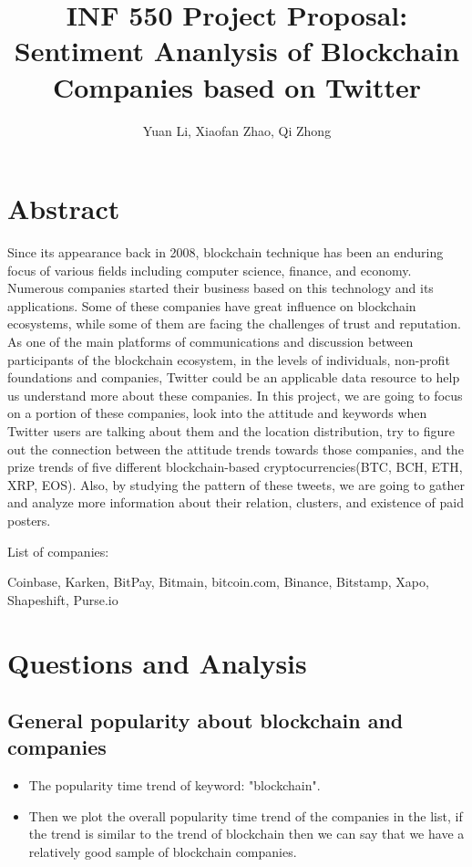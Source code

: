 \documentclass{article}
\begin{document}
\title{INF 550 Project Proposal: Sentiment Ananlysis of Blockchain Companies based on Twitter}
\author{Yuan Li, Xiaofan Zhao, Qi Zhong}
\maketitle
\section{Abstract}
Since its appearance back in 2008, blockchain technique has been an enduring focus of various fields including computer science, finance, and economy. Numerous companies started their business based on this technology and its applications. Some of these companies have great influence on blockchain ecosystems, while some of them are facing the challenges of trust and reputation. As one of the main platforms of communications and discussion between participants of the blockchain ecosystem, in the levels of individuals, non-profit foundations and companies, Twitter could be an applicable data resource to help us understand more about these companies. In this project, we are going to focus on a portion of these companies, look into the attitude and keywords when Twitter users are talking about them and the location distribution, try to figure out the connection between the attitude trends towards those companies, and the prize trends of five different blockchain-based cryptocurrencies(BTC, BCH, ETH, XRP, EOS). Also, by studying the pattern of these tweets, we are going to gather and analyze more information about their relation, clusters, and existence of paid posters.

List of companies: 

Coinbase, Karken, BitPay, Bitmain, bitcoin.com, Binance, Bitstamp, Xapo, Shapeshift, Purse.io
\section{Questions and Analysis}
\subsection{General popularity about blockchain and companies}
\begin{itemize}
\item The popularity time trend of keyword: "blockchain".
\item Then we plot the overall popularity time trend of the companies in the list, if the trend is similar to the trend of blockchain then we can say that we have a relatively good sample of blockchain companies.
\end{itemize}
\end{document}
